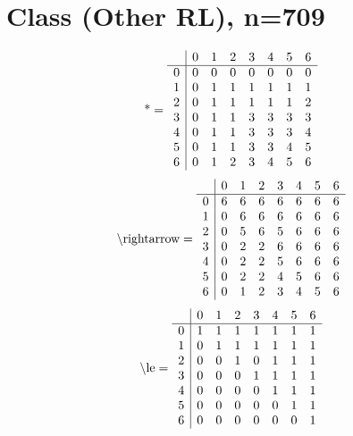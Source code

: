 \documentclass[11pt]{article}
\begin{document}
\section{Class (Other RL), n=709}
\[\text{*} = 
\begin{array}{r | r r r r r r r}
 & 0 & 1 & 2 & 3 & 4 & 5 & 6 \\ \hline
0 & 0 & 0 & 0 & 0 & 0 & 0 & 0 \\
1 & 0 & 1 & 1 & 1 & 1 & 1 & 1 \\
2 & 0 & 1 & 1 & 1 & 1 & 1 & 2 \\
3 & 0 & 1 & 1 & 3 & 3 & 3 & 3 \\
4 & 0 & 1 & 1 & 3 & 3 & 3 & 4 \\
5 & 0 & 1 & 1 & 3 & 3 & 4 & 5 \\
6 & 0 & 1 & 2 & 3 & 4 & 5 & 6 \\
\end{array}
\]
\[\text{\textbackslash rightarrow} = 
\begin{array}{r | r r r r r r r}
 & 0 & 1 & 2 & 3 & 4 & 5 & 6 \\ \hline
0 & 6 & 6 & 6 & 6 & 6 & 6 & 6 \\
1 & 0 & 6 & 6 & 6 & 6 & 6 & 6 \\
2 & 0 & 5 & 6 & 5 & 6 & 6 & 6 \\
3 & 0 & 2 & 2 & 6 & 6 & 6 & 6 \\
4 & 0 & 2 & 2 & 5 & 6 & 6 & 6 \\
5 & 0 & 2 & 2 & 4 & 5 & 6 & 6 \\
6 & 0 & 1 & 2 & 3 & 4 & 5 & 6 \\
\end{array}
\]
\[\text{\textbackslash le} = 
\begin{array}{r | r r r r r r r}
 & 0 & 1 & 2 & 3 & 4 & 5 & 6 \\ \hline
0 & 1 & 1 & 1 & 1 & 1 & 1 & 1 \\
1 & 0 & 1 & 1 & 1 & 1 & 1 & 1 \\
2 & 0 & 0 & 1 & 0 & 1 & 1 & 1 \\
3 & 0 & 0 & 0 & 1 & 1 & 1 & 1 \\
4 & 0 & 0 & 0 & 0 & 1 & 1 & 1 \\
5 & 0 & 0 & 0 & 0 & 0 & 1 & 1 \\
6 & 0 & 0 & 0 & 0 & 0 & 0 & 1 \\
\end{array}
\]
\end{document}
